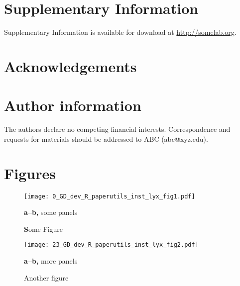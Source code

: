 \documentclass[11pt,british,super,sort&compress]{article}
\begin{document}
\section{Supplementary Information}

Supplementary Information is available for download at \url{http://somelab.org}.


\section{Acknowledgements}


\section{Author information}

The authors declare no competing financial interests. Correspondence
and requests for materials should be addressed to ABC (abc@xyz.edu).\newpage{}\pagestyle{empty}


\section{Figures}



\begin{figure*}[h]
\begin{centering}
\texttt{[image: 0\_GD\_dev\_R\_paperutils\_inst\_lyx\_fig1.pdf]}\caption{\label{fig:wt}\textbf{S}ome Figure}

\par\end{centering}

\textbf{\footnotesize a--b, }{\footnotesize some panels}
\end{figure*}


\newpage{}
\begin{figure*}[h]
\begin{centering}
\texttt{[image: 23\_GD\_dev\_R\_paperutils\_inst\_lyx\_fig2.pdf]}\caption{\label{fig:Or67d}Another figure}

\par\end{centering}

\textbf{\footnotesize a--b,}{\footnotesize{} more panels}
\end{figure*}


\newpage{}

\appendix
\pagestyle{plain}\setcounter{page}{1}%
\end{document}
